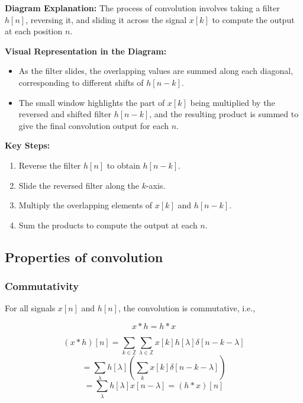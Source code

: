 \begin{intuition}
    \textbf{Diagram Explanation:} The process of convolution involves taking a filter \(h[n]\), reversing it, and sliding it across the signal \(x[k]\) to compute the output at each position \(n\). 
    
    \textbf{Visual Representation in the Diagram:} 
    \begin{itemize}
        \item As the filter slides, the overlapping values are summed along each diagonal, corresponding to different shifts of \(h[n-k]\).
        \item The small window highlights the part of \(x[k]\) being multiplied by the reversed and shifted filter \(h[n-k]\), and the resulting product is summed to give the final convolution output for each \(n\).
    \end{itemize}
    \vspace{1em}
    
    \textbf{Key Steps:}
    \begin{enumerate}
        \item Reverse the filter \(h[n]\) to obtain \(h[n-k]\).
        \item Slide the reversed filter along the \(k\)-axis.
        \item Multiply the overlapping elements of \(x[k]\) and \(h[n-k]\).
        \item Sum the products to compute the output at each \(n\).
    \end{enumerate}
\end{intuition}

\subsection{Properties of convolution}
\subsubsection{Commutativity}
\begin{definition}
    For all signals \(x[n]\) and \(h[n]\), the convolution is commutative, i.e.,
    
    \begin{equation}
    x * h = h * x
    \end{equation}
    \end{definition}
    
\begin{derivation}
    \[
    (x * h)[n] = \sum_{k \in \mathbb{Z}} \sum_{\lambda \in \mathbb{Z}} x[k] h[\lambda] \delta[n - k - \lambda]
    \]
    \[
    = \sum_{\lambda} h[\lambda] \left(\sum_{k} x[k] \delta[n - k - \lambda]\right)
    \]
    \[
    = \sum_{\lambda} h[\lambda] x[n - \lambda] = (h * x)[n]
    \]
\end{derivation}
    
